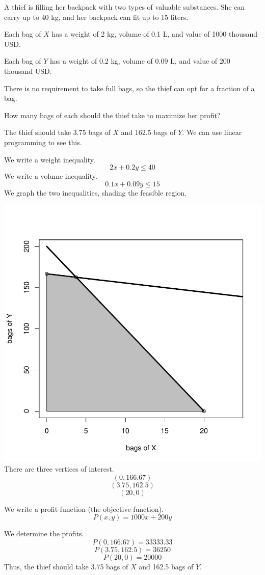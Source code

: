
\begin{question}
A thief is filling her backpack with two types of valuable substances.
She can carry up to 40 kg, and her backpack can fit up to 15 liters.

Each bag of \(X\) has a weight of 2 kg, volume of 0.1 L, and value of
1000 thousand USD.

Each bag of \(Y\) has a weight of 0.2 kg, volume of 0.09 L, and value of
200 thousand USD.

There is no requirement to take full bags, so the thief can opt for a
fraction of a bag.

How many bags of each should the thief take to maximize her profit?
\end{question}

\begin{solution}
The thief should take 3.75 bags of \(X\) and 162.5 bags of \(Y\). We can
use linear programming to see this.

We write a weight inequality. \[2x+0.2y \le 40\] We write a volume
inequality. \[0.1x+0.09y \le 15\] We graph the two inequalities, shading
the feasible region.

\includegraphics{unnamed-chunk-1-1.pdf}\\

There are three vertices of interest. \[(0,166.67) \] \[(3.75,162.5) \]
\[(20,0)\]

We write a profit function (the objective function).
\[P(x,y) = 1000x+200y \]

We determine the profits. \[P(0,166.67)=33333.33 \]
\[P(3.75,162.5)=36250 \] \[P(20,0)=20000 \] Thus, the thief should take
3.75 bags of \(X\) and 162.5 bags of \(Y\).
\end{solution}

